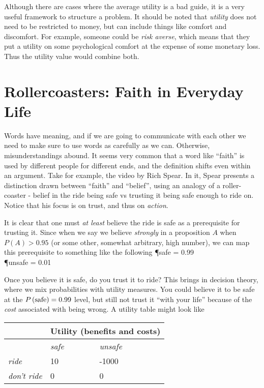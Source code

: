 Although there are cases where the average utility is a bad guide, it is a very useful framework to structure a problem.  It should be noted that {\em utility} does not need to be restricted to money, but can include things like comfort and discomfort.  For example, someone could be {\em risk averse}, which means that they put a utility on some psychological comfort at the expense of some monetary loss.  Thus the utility value would combine both.  

\section{Rollercoasters: Faith in Everyday Life}

Words have meaning, and if we are going to communicate with each other
we need to make sure to use words as carefully as we can.  Otherwise,
misunderstandings abound.  It seems very common that a word like
``faith'' is used by different people for different ends, and the
definition shifts even within an argument.  Take for example, the video by Rich Spear\cite{Spear:2013aa}.  In it, Spear presents a distinction drawn between ``faith'' and ``belief'', using an analogy of a roller-coaster - belief in the ride being safe vs trusting it being safe enough to ride on.  Notice that his focus is on trust, and thus on {\em action}.  

It is clear that one must {\em at least} believe the ride is safe as a prerequisite for trusting it. Since when we say we believe \emph{strongly} in a proposition $A$ when $P(A)>0.95$ (or some other, somewhat arbitrary, high number), we can map this prerequisite to something like the following
\beqn
\P{safe} = 0.99 \\
\P{unsafe} = 0.01
\eeqn

Once you believe it is safe, do you trust it to ride?  This brings in decision theory, where we mix probabilities with utility measures. You could believe it to be safe at the $\P{safe} = 0.99$ level, but still not trust it ``with your life'' because of the \emph{cost} associated with being wrong.  A utility table might look like

\begin{tabular}{@{}lll@{}}
\toprule
 & \multicolumn{2}{c}{\textbf{Utility (benefits and costs)}}  \\ \midrule
 & \textit{safe} & \textit{unsafe}\\
\textit{ride} & 10 & -1000   \\
\textit{don't ride} & 0 & 0  \\ \bottomrule
\end{tabular}
\vspace{.1in}


